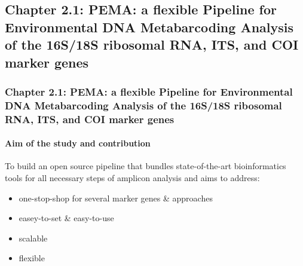 \documentclass{beamer}
\begin{document}
   \begin{darkframes}
      \subsection{\textbf{Chapter 2.1}: PEMA: a flexible Pipeline for Environmental DNA Metabarcoding Analysis of the
      16S/18S ribosomal RNA, ITS, and COI marker genes}
   \end{darkframes}
   
   \begin{darkframes}
      \begin{frame}
         \frametitle{\textbf{Chapter 2.1}: PEMA: a flexible Pipeline for Environmental DNA Metabarcoding Analysis of the
         16S/18S ribosomal RNA, ITS, and COI marker genes}
         \framesubtitle{Aim of the study and contribution}

         To build an open source
         pipeline that bundles state-of-the-art bioinformatics tools for all necessary steps of
         amplicon analysis and aims to address:
         \begin{itemize}
            \item one-stop-shop for several marker genes \& approaches
            \item easey-to-set \& easy-to-use 
            \item scalable
            \item flexible
         \end{itemize}
      \end{frame}
   \end{darkframes}
\end{document}
